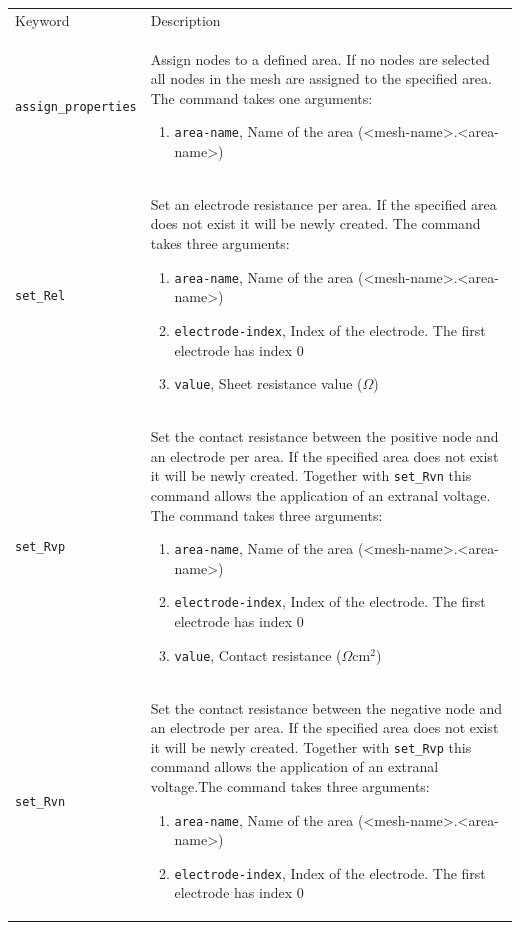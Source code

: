 \documentclass[noshowpacs,preprintnumbers,amsmath,amssymb, letter]{revtex4}
\begin{document}
\begin{longtable}{p{}p{}}
\hline
Keyword & Description \\
\texttt{assign\_properties}	&  Assign nodes to a defined area. If no nodes are selected all nodes in the mesh are assigned to the specified area. The command takes one arguments:
\begin{enumerate}
\item \texttt{area-name}, Name of the area (\textless mesh-name\textgreater .\textless area-name\textgreater )
\end{enumerate}\\
\texttt{set\_Rel}	&  Set an electrode resistance per area. If the specified area does not exist it will be newly created. The command takes three arguments:
\begin{enumerate}
\item \texttt{area-name}, Name of the area (\textless mesh-name\textgreater .\textless area-name\textgreater )
\item \texttt{electrode-index}, Index of the electrode. The first electrode has index 0
\item \texttt{value}, Sheet resistance value ($\Omega$)
\end{enumerate}\\
\texttt{set\_Rvp}	&  Set the contact resistance between the positive node and an electrode per area. If the specified area does not exist it will be newly created. Together with \texttt{set\_Rvn} this command allows the application of an extranal voltage. The command takes three arguments:
\begin{enumerate}
\item \texttt{area-name}, Name of the area (\textless mesh-name\textgreater .\textless area-name\textgreater )
\item \texttt{electrode-index}, Index of the electrode. The first electrode has index 0
\item \texttt{value}, Contact resistance ($\Omega \text{cm}^2$)
\end{enumerate}\\
\texttt{set\_Rvn}	&  Set the contact resistance between the negative node and an electrode per area. If the specified area does not exist it will be newly created. Together with \texttt{set\_Rvp} this command allows the application of an extranal voltage.The command takes three arguments:
\begin{enumerate}
\item \texttt{area-name}, Name of the area (\textless mesh-name\textgreater .\textless area-name\textgreater )
\item \texttt{electrode-index}, Index of the electrode. The first electrode has index 0

\end{enumerate}
\end{longtable}
\end{document}
